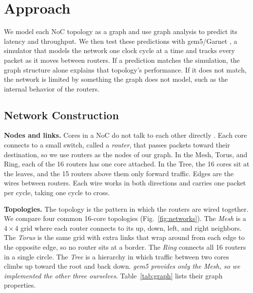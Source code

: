 \documentclass[conference]{IEEEtran}
\begin{document}
\section{Approach}







We model each NoC topology as a graph and use graph analysis to predict its latency and throughput. We then test these predictions with gem5/Garnet \cite{b3,b4}, a simulator that models the network one clock cycle at a time and tracks every packet as it moves between
routers. If a prediction matches the simulation, the graph structure alone explains that topology's performance. If it does not match, the network is limited by something the graph does not model, such as the internal behavior of the routers.

\subsection{Network Construction}
\textbf{Nodes and links.} Cores in a NoC do not talk to each other directly \cite{b5}. Each core connects to a small switch, called a \emph{router}, that passes packets toward their destination, so we use routers as the nodes of our graph. In the Mesh, Torus, and Ring, each
of the 16 routers has one core attached. In the Tree, the 16 cores sit at the leaves, and the 15 routers above them only forward traffic. Edges are the wires between routers. Each wire works in both directions and carries one packet per cycle, taking one cycle to cross.

\textbf{Topologies.} The topology is the pattern in which the routers
are wired together. We compare four common 16-core topologies
(Fig.~\ref{fig:networks}). The \emph{Mesh} is a $4\times4$ grid where each router connects to its up, down, left, and right neighbors. The \emph{Torus} is the same grid with extra links that wrap around from each edge to the opposite edge, so no router sits at a border. The \emph{Ring} connects all 16 routers in a single circle. The \emph{Tree} is a hierarchy in which traffic between two cores climbs up toward the root and back down. \textit{gem5 provides only the Mesh, so we
implemented the other three ourselves}. Table~\ref{tab:graph} lists their graph properties.
\end{document}
